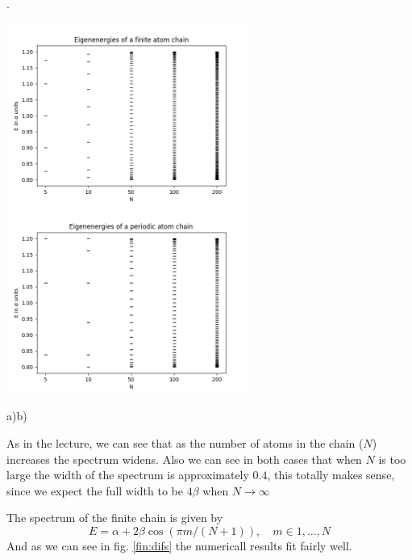 \begin{questions}
\begin{solution}.

  \includegraphics[width=80mm]{finite_chain.png}
  \includegraphics[width=80mm]{periodic_chain.png}\label{chain}

  \hspace{4cm}a)\hspace{7.7cm}b)


 As in the lecture, we can see that as the number of atoms in the chain ($N$) increases the spectrum widens. Also we can see in both cases that when $N$ is too large the width of the spectrum is approximately $0.4$, this totally makes sense, since we expect the full width to be $4\beta$ when $N \rightarrow \infty$

 The spectrum of the finite chain is given by
 \begin{equation}
   E = \alpha + 2\beta\cos{(\pi m/(N+1))}, \quad m\in{1,\ldots,N}
   \label{fin:spec}
 \end{equation}
And as we can see in fig. \ref{fin:difs} the numericall results fit fairly well.


\end{solution}
\end{questions}
